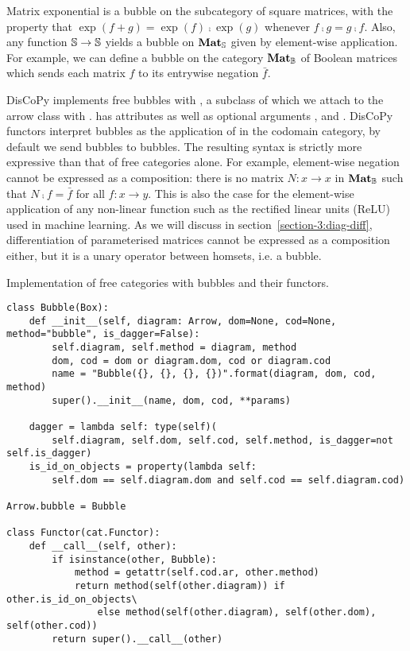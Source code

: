 \begin{example}
Matrix exponential is a bubble on the subcategory of square matrices, with the property that $\exp(f + g) = \exp(f) \fcmp \exp(g)$ whenever $f \fcmp g = g \fcmp f$.
Also, any function $\S \to \S$ yields a bubble on $\mathbf{Mat}_\S$ given by element-wise application.
For example, we can define a bubble on the category $\mathbf{Mat}_\B$ of Boolean matrices which sends each matrix $f$ to its entrywise negation $\bar{f}$.
\end{example}

DisCoPy implements free bubbles with , a subclass of  which we attach to the arrow class with .
 has attributes  as well as optional arguments ,  and .
DisCoPy functors interpret bubbles as the application of  in the codomain category, by default we send bubbles to bubbles.
The resulting syntax is strictly more expressive than that of free categories alone.
For example, element-wise negation cannot be expressed as a composition: there is no matrix $N : x \to x$ in $\mathbf{Mat}_\B$ such that $N \fcmp f = \bar{f}$ for all $f : x \to y$.
This is also the case for the element-wise application of any non-linear function such as the rectified linear units (ReLU) used in machine learning.
As we will discuss in section~\ref{section-3:diag-diff}, differentiation of parameterised matrices cannot be expressed as a composition either, but it is a unary operator between homsets, i.e. a bubble.

\begin{python}
{\normalfont Implementation of free categories with bubbles and their functors.}

\begin{verbatim}
class Bubble(Box):
    def __init__(self, diagram: Arrow, dom=None, cod=None, method="bubble", is_dagger=False):
        self.diagram, self.method = diagram, method
        dom, cod = dom or diagram.dom, cod or diagram.cod
        name = "Bubble({}, {}, {}, {})".format(diagram, dom, cod, method)
        super().__init__(name, dom, cod, **params)

    dagger = lambda self: type(self)(
        self.diagram, self.dom, self.cod, self.method, is_dagger=not self.is_dagger)
    is_id_on_objects = property(lambda self:
        self.dom == self.diagram.dom and self.cod == self.diagram.cod)

Arrow.bubble = Bubble

class Functor(cat.Functor):
    def __call__(self, other):
        if isinstance(other, Bubble):
            method = getattr(self.cod.ar, other.method)
            return method(self(other.diagram)) if other.is_id_on_objects\
                else method(self(other.diagram), self(other.dom), self(other.cod))
        return super().__call__(other)
\end{verbatim}
\end{python}

